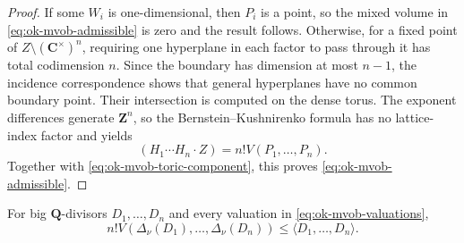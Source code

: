 \begin{proof}
If some \(W_i\) is one-dimensional, then \(P_i\) is a point, so the mixed
volume in \eqref{eq:ok-mvob-admissible} is zero and the result follows.
Otherwise, for a fixed point of
\(Z\setminus(\mathbf C^\times)^n\), requiring one hyperplane in each factor
to pass through it has total codimension \(n\).  Since the boundary has
dimension at most \(n-1\), the incidence correspondence shows that general
hyperplanes have no common boundary point.  Their intersection is computed
on the dense torus.  The exponent differences generate \(\mathbf Z^n\), so
the Bernstein--Kushnirenko formula \cite{Ber75} has no lattice-index factor
and yields
\[
                    (H_1\cdots H_n\cdot Z)=n!V(P_1,\ldots,P_n).
\]
Together with \eqref{eq:ok-mvob-toric-component}, this proves
\eqref{eq:ok-mvob-admissible}.
\end{proof}

\begin{proposition}\label{prop:ok-mvob-movable-upper}
For big \(\mathbf Q\)-divisors \(D_1,\ldots,D_n\) and every valuation in
\eqref{eq:ok-mvob-valuations},
\[
 n!V(\Delta_\nu(D_1),\ldots,\Delta_\nu(D_n))
 \leq\langle D_1,\ldots,D_n\rangle.
\tag{55.36}\label{eq:ok-mvob-movable-upper}
\]
\end{proposition}

